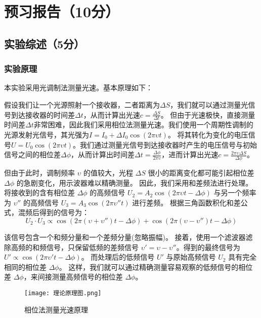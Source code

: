 \documentclass{Phyport}
\begin{document}
\setcounter{page}{0}
\makecover


\section{预习报告（10分）}
\subsection{实验综述（5分）}
\subsubsection{实验原理}
本实验采用光调制法测量光速。基本原理如下：

假设我们让一个光源照射一个接收器，二者距离为$\Delta S$，我们就可以通过测量光信号到达接收器的时间差$\Delta t$，从而计算出光速$c=\frac{\Delta S}{\Delta t}$。
但由于光速极快，直接测量时间差$\Delta t$非常困难，因此我们采用相位法测量光速。我们使用一个周期性调制的光源发射光信号，其光强为$I=I_0 +\Delta I_0 \cos(2\pi \upsilon t)$。
将其转化为变化的电压信号$U=U_0 \cos(2\pi \upsilon t)$。我们通过测量光信号到达接收器时产生的电压信号与初始信号之间的相位差$\Delta \phi$，从而计算出时间差$\Delta t=\frac{\Delta \phi}{2\pi \upsilon }$，进而计算出光速$c=\frac{2\pi \upsilon  \Delta S}{\Delta \phi}$。

但由于此时，调制频率 $\upsilon $ 的值较大，光程 $\Delta S$ 很小的距离变化都可能引起相位差 $\Delta \phi$ 的急剧变化，用示波器难以精确测量。
因此，我们采用和差频法进行处理。将接收到的含有相位差 $\Delta \phi$ 的高频信号 $U_2 = A_2 \cos(2\pi \upsilon t - \Delta\phi)$ 与另一个频率为 $\upsilon ''$ 的高频信号 $U_3 = A_3 \cos(2\pi \upsilon ''t)$ 进行差频。
根据三角函数积化和差公式，混频后得到的信号为：
\begin{equation}
U_2 \cdot U_3 \propto \cos(2\pi(\upsilon +\upsilon '')t - \Delta\phi) + \cos(2\pi(\upsilon -\upsilon '')t - \Delta\phi)
\end{equation}

该信号包含一个和频分量和一个差频分量(忽略振幅)。
接着，使用一个滤波器滤除高频的和频信号，只保留低频的差频信号 $\upsilon ' = \upsilon  - \upsilon ''$。得到的最终信号为 $U' \propto \cos(2\pi \upsilon 't - \Delta\phi)$。
而处理后的低频信号 $U'$ 与原始高频信号 $U_2$ 具有完全相同的相位差 $\Delta\phi$。
这样，我们就可以通过精确测量容易观察的低频信号的相位差 $\Delta\phi$，来间接测量高频信号的相位差 $\Delta\phi$。

\begin{figure}[H]
    \centering
    \texttt{[image: 理论原理图.png]}
    \caption{相位法测量光速原理}
    \label{fig:相位法原理}
\end{figure}
\end{document}

